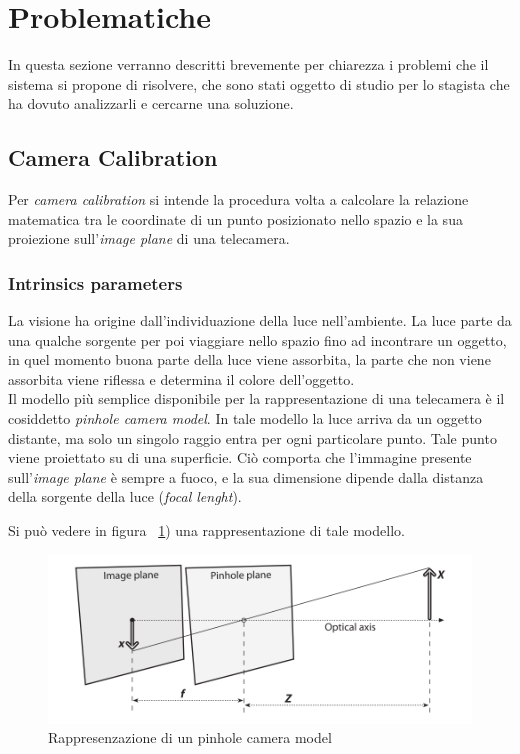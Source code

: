 \section{Problematiche} \label{sec:prob}
In questa sezione verranno descritti brevemente per chiarezza i problemi che il sistema si propone di risolvere, che sono stati oggetto di studio per lo stagista che ha dovuto analizzarli e cercarne una soluzione.
\subsection{Camera Calibration} \label{sec:camcalib}
Per \textit{camera calibration} si intende la procedura volta a calcolare la relazione matematica tra le coordinate di un punto posizionato nello spazio e la sua proiezione sull'\textit{image plane} di una telecamera. \\

\subsubsection{Intrinsics parameters}
La visione ha origine dall'individuazione della luce nell'ambiente. La luce parte da una qualche sorgente per poi viaggiare nello spazio fino ad incontrare un oggetto, in quel momento buona parte della luce viene assorbita, la parte che non viene assorbita viene riflessa e determina il colore dell'oggetto. \\

Il modello più semplice disponibile per la rappresentazione di una telecamera è il cosiddetto \textit{pinhole camera model}. In tale modello la luce arriva da un oggetto distante, ma solo un singolo raggio entra per ogni particolare punto. Tale punto viene proiettato su di una superficie. Ciò comporta che l'immagine presente sull'\textit{image plane} è sempre a fuoco, e la sua dimensione dipende dalla distanza della sorgente della luce (\textit{focal lenght}).

Si può vedere in figura ~\ref{fig:calib1}) una rappresentazione di tale modello.
\begin{figure}[htpb] 
\centering 
\includegraphics[scale=0.4]{./images/calib1.png} 
\caption{Rappresenzazione di un pinhole camera model} 
\label{fig:calib1}
\end{figure} 

